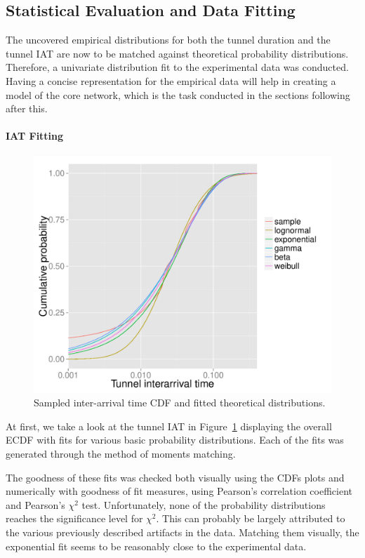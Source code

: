 \subsection{Statistical Evaluation and Data Fitting}
\label{c4:sec:statistical_evaluation}

The uncovered empirical distributions for both the tunnel duration and the tunnel \gls{IAT} are now to be matched against theoretical probability distributions. Therefore, a univariate distribution fit to the experimental data was conducted. Having a concise representation for the empirical data will help in creating a model of the core network, which is the task conducted in the sections following after this.


\paragraph{\gls{IAT} Fitting}

\begin{figure}[htb]
    \centering
    \includegraphics[width=\columnwidth]{images/R-IAT-ecdfs.pdf}
    \caption{Sampled inter-arrival time CDF and fitted theoretical distributions.}
    \label{c4:fig:IAT-cdfs}
\end{figure}

At first, we take a look at the tunnel \gls{IAT} in Figure~\ref{c4:fig:IAT-cdfs} displaying the overall \gls{ECDF} with fits for various basic probability distributions. Each of the fits was generated through the method of moments matching.

The goodness of these fits was checked both visually using the \glspl{CDF} plots and numerically with goodness of fit measures, using Pearson's correlation coefficient and Pearson's $\chi^2$ test. Unfortunately, none of the probability distributions reaches the significance level for $\chi^2$. This can probably be largely attributed to the various previously described artifacts in the data. Matching them visually, the exponential fit seems to be reasonably close to the experimental data.

